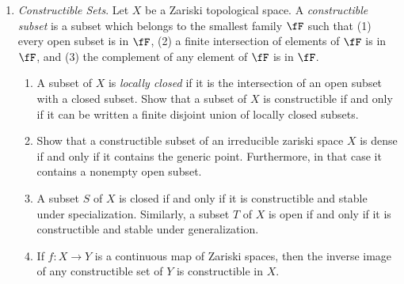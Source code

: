 \documentclass[12pt]{amsart}
\begin{document}
\begin{enumerate}
  \item[II.3.18] {
      \emph{Constructible Sets}.
      Let $X$ be a Zariski topological space.
      A \emph{constructible subset} is a subset which belongs to the smallest family $\fF$ such that (1) every open subset is in $\fF$, (2) a finite intersection of elements of $\fF$ is in $\fF$, and (3) the complement of any element of $\fF$ is in $\fF$.
      \begin{enumerate}
        \item A subset of $X$ is \emph{locally closed} if it is the intersection of an open subset with a closed subset.
          Show that a subset of $X$ is constructible if and only if it can be written a finite disjoint union of locally closed subsets.
        \item Show that a constructible subset of an irreducible zariski space $X$ is dense if and only if it contains the generic point.
          Furthermore, in that case it contains a nonempty open subset.
        \item A subset $S$ of $X$ is closed if and only if it is constructible and stable under specialization.
          Similarly, a subset $T$ of $X$ is open if and only if it is constructible and stable under generalization.
        \item If $f:X\to Y$ is a continuous map of Zariski spaces, then the inverse image of any constructible set of $Y$ is constructible in $X$.
      \end{enumerate}
    }
\end{enumerate}
\end{document}
